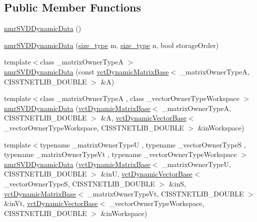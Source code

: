 \subsection*{Public Member Functions}
\begin{DoxyCompactItemize}
\item 
\hyperlink{classnmr_s_v_d_dynamic_data_a4593ac097bf34c9d47dd5376fff4a1ad}{nmr\-S\-V\-D\-Dynamic\-Data} ()
\item 
\hyperlink{classnmr_s_v_d_dynamic_data_a7421212bc93d5918f8cb0304b86af723}{nmr\-S\-V\-D\-Dynamic\-Data} (\hyperlink{classnmr_s_v_d_dynamic_data_ae1d183124f1fe39da05af9cea168101d}{size\-\_\-type} m, \hyperlink{classnmr_s_v_d_dynamic_data_ae1d183124f1fe39da05af9cea168101d}{size\-\_\-type} n, bool storage\-Order)
\item 
{\footnotesize template$<$class \-\_\-matrix\-Owner\-Type\-A $>$ }\\\hyperlink{classnmr_s_v_d_dynamic_data_a30ec8ad8e492d372f738d432812ccb90}{nmr\-S\-V\-D\-Dynamic\-Data} (const \hyperlink{classvct_dynamic_matrix_base}{vct\-Dynamic\-Matrix\-Base}$<$ \-\_\-matrix\-Owner\-Type\-A, C\-I\-S\-S\-T\-N\-E\-T\-L\-I\-B\-\_\-\-D\-O\-U\-B\-L\-E $>$ \&A)
\item 
{\footnotesize template$<$class \-\_\-matrix\-Owner\-Type\-A , class \-\_\-vector\-Owner\-Type\-Workspace $>$ }\\\hyperlink{classnmr_s_v_d_dynamic_data_a9e541e82c336fdf328d07906b01332ff}{nmr\-S\-V\-D\-Dynamic\-Data} (\hyperlink{classvct_dynamic_matrix_base}{vct\-Dynamic\-Matrix\-Base}$<$ \-\_\-matrix\-Owner\-Type\-A, C\-I\-S\-S\-T\-N\-E\-T\-L\-I\-B\-\_\-\-D\-O\-U\-B\-L\-E $>$ \&A, \hyperlink{classvct_dynamic_vector_base}{vct\-Dynamic\-Vector\-Base}$<$ \-\_\-vector\-Owner\-Type\-Workspace, C\-I\-S\-S\-T\-N\-E\-T\-L\-I\-B\-\_\-\-D\-O\-U\-B\-L\-E $>$ \&in\-Workspace)
\item 
{\footnotesize template$<$typename \-\_\-matrix\-Owner\-Type\-U , typename \-\_\-vector\-Owner\-Type\-S , typename \-\_\-matrix\-Owner\-Type\-Vt , typename \-\_\-vector\-Owner\-Type\-Workspace $>$ }\\\hyperlink{classnmr_s_v_d_dynamic_data_a8343a2867cf615e4deb350369e0a29ff}{nmr\-S\-V\-D\-Dynamic\-Data} (\hyperlink{classvct_dynamic_matrix_base}{vct\-Dynamic\-Matrix\-Base}$<$ \-\_\-matrix\-Owner\-Type\-U, C\-I\-S\-S\-T\-N\-E\-T\-L\-I\-B\-\_\-\-D\-O\-U\-B\-L\-E $>$ \&in\-U, \hyperlink{classvct_dynamic_vector_base}{vct\-Dynamic\-Vector\-Base}$<$ \-\_\-vector\-Owner\-Type\-S, C\-I\-S\-S\-T\-N\-E\-T\-L\-I\-B\-\_\-\-D\-O\-U\-B\-L\-E $>$ \&in\-S, \hyperlink{classvct_dynamic_matrix_base}{vct\-Dynamic\-Matrix\-Base}$<$ \-\_\-matrix\-Owner\-Type\-Vt, C\-I\-S\-S\-T\-N\-E\-T\-L\-I\-B\-\_\-\-D\-O\-U\-B\-L\-E $>$ \&in\-Vt, \hyperlink{classvct_dynamic_vector_base}{vct\-Dynamic\-Vector\-Base}$<$ \-\_\-vector\-Owner\-Type\-Workspace, C\-I\-S\-S\-T\-N\-E\-T\-L\-I\-B\-\_\-\-D\-O\-U\-B\-L\-E $>$ \&in\-Workspace)

\end{DoxyCompactItemize}
